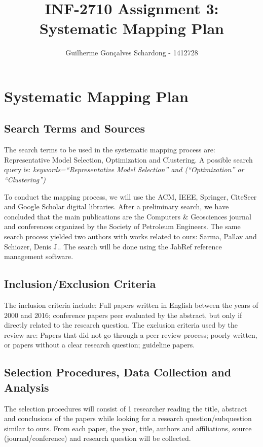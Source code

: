 \documentclass[]{article}
\title{INF-2710 Assignment 3: Systematic Mapping Plan}
\author{Guilherme Gon\c{c}alves Schardong - 1412728}
\begin{document}
\maketitle

\section{Systematic Mapping Plan}

\subsection{Search Terms and Sources}

The search terms to be used in the systematic mapping process are: Representative Model Selection, Optimization and Clustering.
A possible search query is: \textit{keywords=``Representative Model Selection'' and (``Optimization'' or ``Clustering'')}

To conduct the mapping process, we will use the ACM, IEEE, Springer, CiteSeer and Google Scholar digital libraries. After a preliminary search, we have concluded that the main publications are the Computers \& Geosciences journal and conferences organized by the Society of Petroleum Engineers. The same search process yielded two authors with works related to ours: Sarma, Pallav and Schiozer, Denis J.. The search will be done using the JabRef reference management software.

\subsection{Inclusion/Exclusion Criteria}

The inclusion criteria include: Full papers written in English between the years of 2000 and 2016; conference papers peer evaluated by the abstract, but only if directly related to the research question. The exclusion criteria used by the review are: Papers that did not go through a peer review process; poorly written, or papers without a clear research question; guideline papers.

\subsection{Selection Procedures, Data Collection and Analysis}

The selection procedures will consist of 1 researcher reading the title, abstract and conclusions of the papers while looking for a research question/subquestion similar to ours. From each paper, the year, title, authors and affiliations, source (journal/conference) and research question will be collected.
\end{document}

